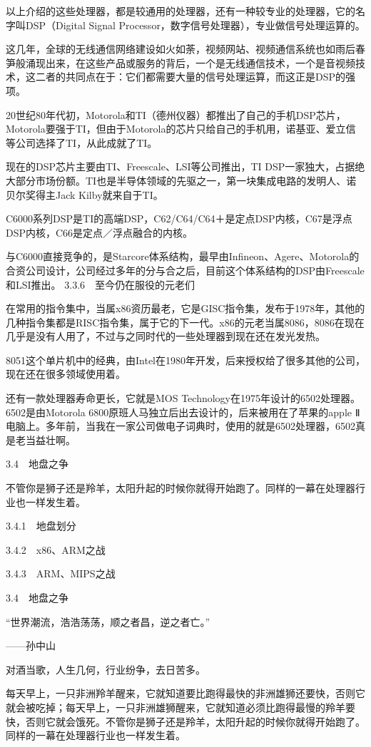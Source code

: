 \documentclass[12pt,UTF8]{ctexbook}
\begin{document}
以上介绍的这些处理器，都是较通用的处理器，还有一种较专业的处理器，它的名字叫DSP（Digital Signal Processor，数字信号处理器），专业做信号处理运算的。

这几年，全球的无线通信网络建设如火如荼，视频网站、视频通信系统也如雨后春笋般涌现出来，在这些产品或服务的背后，一个是无线通信技术，一个是音视频技术，这二者的共同点在于：它们都需要大量的信号处理运算，而这正是DSP的强项。

20世纪80年代初，Motorola和TI（德州仪器）都推出了自己的手机DSP芯片，Motorola要强于TI，但由于Motorola的芯片只给自己的手机用，诺基亚、爱立信等公司选择了TI，从此成就了TI。

现在的DSP芯片主要由TI、Freescale、LSI等公司推出，TI DSP一家独大，占据绝大部分市场份额。TI也是半导体领域的先驱之一，第一块集成电路的发明人、诺贝尔奖得主Jack Kilby就来自于TI。

C6000系列DSP是TI的高端DSP，C62/C64/C64＋是定点DSP内核，C67是浮点DSP内核，C66是定点／浮点融合的内核。

与C6000直接竞争的，是Starcore体系结构，最早由Infineon、Agere、Motorola的合资公司设计，公司经过多年的分与合之后，目前这个体系结构的DSP由Freescale和LSI推出。
3.3.6　至今仍在服役的元老们

在常用的指令集中，当属x86资历最老，它是GISC指令集，发布于1978年，其他的几种指令集都是RISC指令集，属于它的下一代。x86的元老当属8086，8086在现在几乎是没有人用了，不过与之同时代的一些处理器到现在还在发光发热。

8051这个单片机中的经典，由Intel在1980年开发，后来授权给了很多其他的公司，现在还在很多领域使用着。

还有一款处理器寿命更长，它就是MOS Technology在1975年设计的6502处理器。6502是由Motorola 6800原班人马独立后出去设计的，后来被用在了苹果的apple Ⅱ电脑上。多年前，当我在一家公司做电子词典时，使用的就是6502处理器，6502真是老当益壮啊。


3.4　地盘之争

不管你是狮子还是羚羊，太阳升起的时候你就得开始跑了。同样的一幕在处理器行业也一样发生着。

3.4.1　地盘划分

3.4.2　x86、ARM之战

3.4.3　ARM、MIPS之战


3.4　地盘之争

“世界潮流，浩浩荡荡，顺之者昌，逆之者亡。”

——孙中山

对酒当歌，人生几何，行业纷争，去日苦多。

每天早上，一只非洲羚羊醒来，它就知道要比跑得最快的非洲雄狮还要快，否则它就会被吃掉；每天早上，一只非洲雄狮醒来，它就知道必须比跑得最慢的羚羊要快，否则它就会饿死。不管你是狮子还是羚羊，太阳升起的时候你就得开始跑了。同样的一幕在处理器行业也一样发生着。
\end{document}
